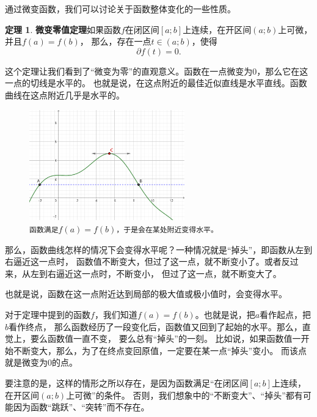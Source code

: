 \documentclass[12pt,UTF8]{ctexbook}
\theoremstyle{definition}
\newtheorem{tm}{定理}[section]
\theoremstyle{plain}
\begin{document}
通过微变函数，我们可以讨论关于函数整体变化的一些性质。

\begin{tm}{\textbf{微变零值定理}}\label{tm:2-4-0}
    如果函数$f$在闭区间$[a; b]$上连续，在开区间$(a; b)$上可微，并且$f(a) = f(b)$，
    那么，存在一点$t\in(a; b)$，使得
    $$ \partial f(t) = 0.$$
\end{tm}

这个定理让我们看到了“微变为零”的直观意义。函数在一点微变为$0$，那么它在这一点的切线是水平的。
也就是说，在这点附近的最佳近似直线是水平直线。函数曲线在这点附近几乎是水平的。

\begin{figure}[h]
    \centering
    \includegraphics[width=0.6\textwidth]{tu/微变零值定理1.png}    
    \caption*{\texttt{函数满足}$f(a) = f(b)$\texttt{，于是会在某处附近变得水平。}}
\end{figure}

那么，函数曲线怎样的情况下会变得水平呢？一种情况就是“掉头”，即函数从左到右逼近这一点时，
函数值不断变大，但过了这一点，就不断变小了。或者反过来，从左到右逼近这一点时，不断变小，
但过了这一点，就不断变大了。

也就是说，函数在这一点附近达到局部的极大值或极小值时，会变得水平。

对于定理中提到的函数$f$，我们知道$f(a) = f(b)$。也就是说，把$a$看作起点，把$b$看作终点，
那么函数经历了一段变化后，函数值又回到了起始的水平。那么，直觉上，要么函数值一直不变，
要么总有“掉头”的一刻。
比如说，如果函数值一开始不断变大，那么，为了在终点变回原值，一定要在某一点“掉头”变小。
而该点就是微变为$0$的点。

要注意的是，这样的情形之所以存在，是因为函数满足“在闭区间$[a; b]$上连续，在开区间$(a; b)$上可微”的条件。
否则，我们想象中的“不断变大”、“掉头”都有可能因为函数“跳跃”、“突转”而不存在。
\end{document}
